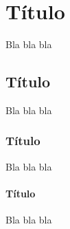 \chapter{Título}

Bla bla bla

\section{Título}

Bla bla bla

\subsection{Título}

Bla bla bla

\subsubsection{Título}

Bla bla bla
